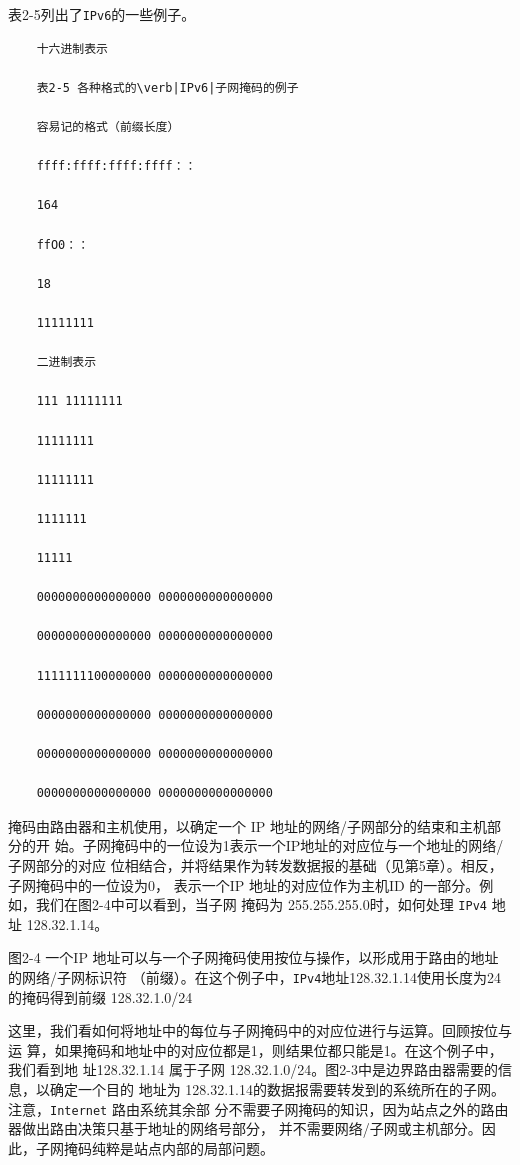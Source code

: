表2-5列出了\verb|IPv6|的一些例子。

\begin{verbatim}
    十六进制表示
    
    表2-5 各种格式的\verb|IPv6|子网掩码的例子
    
    容易记的格式（前缀长度）
    
    ffff:ffff:ffff:ffff：：
    
    164
    
    ffO0：：
    
    18
    
    11111111
    
    二进制表示
    
    111 11111111
    
    11111111
    
    11111111
    
    1111111
    
    11111
    
    0000000000000000 0000000000000000
    
    0000000000000000 0000000000000000
    
    1111111100000000 0000000000000000
    
    0000000000000000 0000000000000000
    
    0000000000000000 0000000000000000
    
    0000000000000000 0000000000000000
\end{verbatim}

掩码由路由器和主机使用，以确定一个 IP 地址的网络/子网部分的结束和主机部分的开
始。子网掩码中的一位设为1表示一个IP地址的对应位与一个地址的网络/子网部分的对应
位相结合，并将结果作为转发数据报的基础（见第5章）。相反，子网掩码中的一位设为0，
表示一个IP 地址的对应位作为主机ID 的一部分。例如，我们在图2-4中可以看到，当子网
掩码为 255.255.255.0时，如何处理 \verb|IPv4| 地址 128.32.1.14。

图2-4 一个IP 地址可以与一个子网掩码使用按位与操作，以形成用于路由的地址的网络/子网标识符
（前缀）。在这个例子中，\verb|IPv4|地址128.32.1.14使用长度为24的掩码得到前缀 128.32.1.0/24

这里，我们看如何将地址中的每位与子网掩码中的对应位进行与运算。回顾按位与运
算，如果掩码和地址中的对应位都是1，则结果位都只能是1。在这个例子中，我们看到地
址128.32.1.14 属于子网 128.32.1.0/24。图2-3中是边界路由器需要的信息，以确定一个目的
地址为 128.32.1.14的数据报需要转发到的系统所在的子网。注意，\verb|Internet| 路由系统其余部
分不需要子网掩码的知识，因为站点之外的路由器做出路由决策只基于地址的网络号部分，
并不需要网络/子网或主机部分。因此，子网掩码纯粹是站点内部的局部问题。

